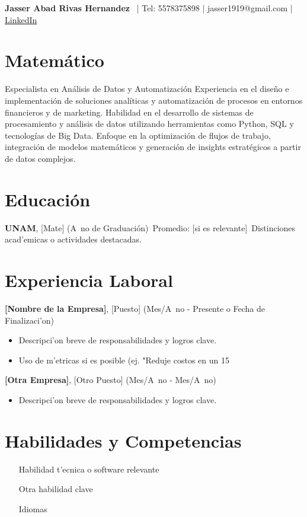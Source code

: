 \documentclass[a4paper,10pt]{article}
\begin{document}
\begin{center}
{\LARGE \textbf{Jasser Abad Rivas Hernandez}} \
| Tel: 5578375898 | jasser1919@gmail.com | \href{https://www.linkedin.com/in/jasser-abad-rivas-hernandez-289421209}{LinkedIn}
\end{center}

\section*{Matemático}
Especialista en Análisis de Datos y Automatización
Experiencia en el diseño e implementación de soluciones analíticas y automatización de procesos en entornos financieros y de marketing. Habilidad en el desarrollo de sistemas de procesamiento y análisis de datos utilizando herramientas como Python, SQL y tecnologías de Big Data. Enfoque en la optimización de flujos de trabajo, integración de modelos matemáticos y generación de insights estratégicos a partir de datos complejos.

\section*{Educación}
\textbf{UNAM}, [Mate] \hfill (A~no de Graduación)\
Promedio: [si es relevante]\
Distinciones acad'emicas o actividades destacadas.

\section*{Experiencia Laboral}
\textbf{[Nombre de la Empresa]}, [Puesto] \hfill (Mes/A~no - Presente o Fecha de Finalizaci'on)\
\begin{itemize}
\item Descripci'on breve de responsabilidades y logros clave.
\item Uso de m'etricas si es posible (ej. "Reduje costos en un 15%
\end{itemize}

\textbf{[Otra Empresa]}, [Otro Puesto] \hfill (Mes/A~no - Mes/A~no)\
\begin{itemize}
\item Descripci'on breve de responsabilidades y logros clave.
\end{itemize}

\section*{Habilidades y Competencias}
\begin{itemize}
\item [Habilidad t'ecnica o software relevante]
\item [Otra habilidad clave]
\item [Idiomas]
\end{itemize}
\end{document}
